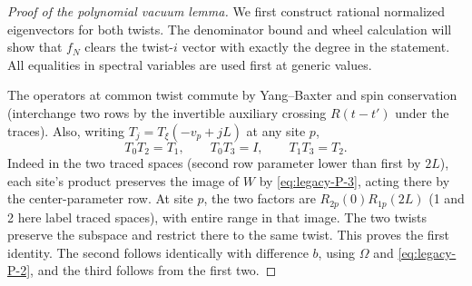 \begin{proof}[Proof of the polynomial vacuum lemma]
We first construct rational normalized eigenvectors for both twists. The denominator bound and wheel calculation will show that \(f_N\) clears the twist-\(i\) vector with exactly the degree in the statement. All equalities in spectral variables are used first at generic values.

The operators at common twist commute by Yang--Baxter and spin conservation (interchange two rows by the invertible auxiliary crossing \(R(t-t')\) under the traces). Also, writing \(T_j=T_\xi(-v_p+jL)\) at any site \(p\),
\begin{equation}
 T_0T_2=T_1,\qquad T_0T_3=I,\qquad T_1T_3=T_2.                 \label{eq:legacy-P-11}
\end{equation}
Indeed in the two traced spaces (second row parameter lower than first by \(2L\)), each site's product preserves the image of \(W\) by \eqref{eq:legacy-P-3}, acting there by the center-parameter row. At site \(p\), the two factors are \(R_{2p}(0)R_{1p}(2L)\) (1 and 2 here label traced spaces), with entire range in that image. The two twists preserve the subspace and restrict there to the same twist. This proves the first identity. The second follows identically with difference \(b\), using \(\Omega\) and \eqref{eq:legacy-P-2}, and the third follows from the first two.


\end{proof}
